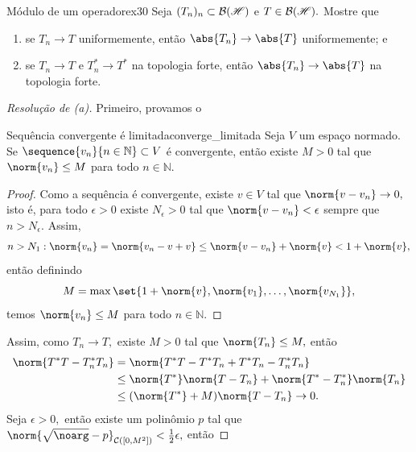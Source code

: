\begin{exercício}{Módulo de um operador}{ex30}
    Seja \((T_n)_n \subset \mathcal{B}(\mathscr{H})\) e \(T \in \mathcal{B}(\mathscr{H}).\) Mostre que
    \begin{enumerate}[label=(\alph*)]
      \item se \(T_n \to T\) uniformemente, então \(\abs{T_n} \to \abs{T}\) uniformemente; e
      \item se \(T_n \to T\) e \(T_n^* \to T^*\) na topologia forte, então \(\abs{T_n} \to \abs{T}\) na topologia forte.
    \end{enumerate}
\end{exercício}
\begin{proof}[Resolução de (a)]
  Primeiro, provamos o
  \begin{lemma}{Sequência convergente é limitada}{converge_limitada}
    Seja \(V\) um espaço normado. Se \(\sequence{v_n}{n\in\mathbb{N}}\subset V\) é convergente, então existe \(M > 0\) tal que \(\norm{v_n} \leq M\) para todo \(n \in \mathbb{N}.\)
  \end{lemma}
  \begin{proof}
    Como a sequência é convergente, existe \(v \in V\) tal que \(\norm{v - v_n} \to 0,\) isto é, para todo \(\epsilon > 0\) existe \(N_\epsilon > 0\) tal que \(\norm{v - v_n} < \epsilon\) sempre que \(n > N_\epsilon.\) Assim,
    \begin{equation*}
      n > N_1 : \norm{v_n} = \norm{v_n - v + v} \leq \norm{v - v_n} + \norm{v} < 1 + \norm{v},
    \end{equation*}
    então definindo
    \begin{equation*}
      M = \max\set{1 + \norm{v}, \norm{v_1}, \dots, \norm{v_{N_1}}},
    \end{equation*}
    temos \(\norm{v_n} \leq M\) para todo \(n \in \mathbb{N}.\)
  \end{proof}
  Assim, como \(T_n \to T,\) existe \(M > 0\) tal que \(\norm{T_n} \leq M,\) então
  \begin{align*}
    \norm{T^*T - T^*_nT_n} &= \norm{T^*T - T^*T_n + T^*T_n - T^*_nT_n}\\
                           &\leq \norm{T^*} \norm{T - T_n} + \norm{T^* - T^*_n} \norm{T_n}\\
                           &\leq (\norm{T^*} + M)\norm{T - T_n}\to 0.
  \end{align*}
  Seja \(\epsilon > 0,\) então existe um polinômio \(p\) tal que \(\norm{\sqrt{\noarg} - p}_{\mathcal{C}([0,M^2])} < \frac12\epsilon,\) então

\end{proof}
